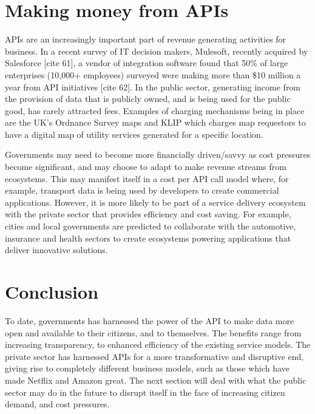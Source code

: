 \section{Making money from APIs}

APIs are an increasingly important part of revenue generating activities for
business. In a recent survey of IT decision makers, Mulesoft, recently acquired
by Salesforce [cite 61], a vendor of integration software found that 50\% of
large enterprises (10,000+ employees) surveyed were making more than \$10 million
a year from API initiatives [cite 62]. In the public sector, generating income
from the provision of data that is publicly owned, and is being used for the
public good, has rarely attracted fees. Examples of charging mechanisms being in
place are the UK’s Ordnance Survey maps and KLIP  which charges map requestors
to have a digital map of utility services generated for a specific location.

Governments may need to become more financially driven/savvy as cost pressures
become significant, and may choose to adapt to make revenue streams from ecosystems.
This may manifest itself in a cost per API call model where, for example, transport
data is being used by developers to create commercial applications. However, it is
more likely to be part of a service delivery ecosystem with the private sector that
provides efficiency and cost saving. For example, cities and local governments are
predicted to collaborate with the automotive, insurance and health sectors to create ecosystems powering applications that deliver
innovative solutions.

\section{Conclusion}

To date, governments has harnessed the power of the API to make data more open and
available to their citizens, and to themselves. The benefits range from increasing transparency, to enhanced efficiency of the existing service models. The private
sector has harnessed APIs for a more transformative and disruptive end, giving rise
to completely different business models, such as those which have made Netflix and
Amazon great. The next section will deal with what the public sector may do in the
future to disrupt itself in the face of increasing citizen demand, and cost pressures.	
